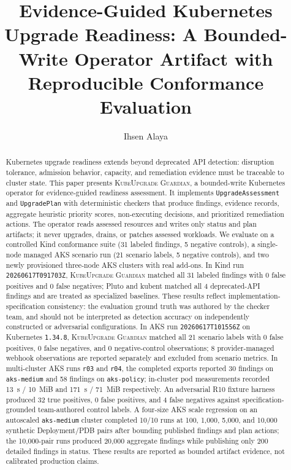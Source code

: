 \documentclass[10pt,journal]{IEEEtran}
\title{Evidence-Guided Kubernetes Upgrade Readiness: A Bounded-Write Operator Artifact with Reproducible Conformance Evaluation}
\author{Ihsen Alaya}
\newcommand{\tool}{\textsc{KubeUpgrade Guardian}}
\newcommand{\crd}[1]{\texttt{#1}}
\newcommand{\code}[1]{\texttt{#1}}
\begin{document}
\maketitle

\begin{abstract}
Kubernetes upgrade readiness extends beyond deprecated API detection: disruption tolerance, admission behavior, capacity, and remediation evidence must be traceable to cluster state. This paper presents \tool, a bounded-write Kubernetes operator for evidence-guided readiness assessment. It implements \crd{UpgradeAssessment} and \crd{UpgradePlan} with deterministic checkers that produce findings, evidence records, aggregate heuristic priority scores, non-executing decisions, and prioritized remediation actions. The operator reads assessed resources and writes only status and plan artifacts; it never upgrades, drains, or patches assessed workloads.
We evaluate on a controlled Kind conformance suite (31 labeled findings, 5 negative controls), a single-node managed AKS scenario run (21 scenario labels, 5 negative controls), and two newly provisioned three-node AKS clusters with real add-ons. In Kind run \code{20260617T091703Z}, \tool{} matched all 31 labeled findings with 0 false positives and 0 false negatives; Pluto and kubent matched all 4 deprecated-API findings and are treated as specialized baselines. These results reflect implementation-specification consistency: the evaluation ground truth was authored by the checker team, and should not be interpreted as detection accuracy on independently constructed or adversarial configurations. In AKS run \code{20260617T101556Z} on Kubernetes \code{1.34.8}, \tool{} matched all 21 scenario labels with 0 false positives, 0 false negatives, and 0 negative-control observations; 8 provider-managed webhook observations are reported separately and excluded from scenario metrics. In multi-cluster AKS runs \code{r03} and \code{r04}, the completed exports reported 30 findings on \code{aks-medium} and 58 findings on \code{aks-policy}; in-cluster pod measurements recorded 13~s / 10~MiB and 171~s / 71~MiB respectively. An adversarial R10 fixture harness produced 32 true positives, 0 false positives, and 4 false negatives against specification-grounded team-authored control labels. A four-size AKS scale regression on an autoscaled \code{aks-medium} cluster completed 10/10 runs at 100, 1,000, 5,000, and 10,000 synthetic Deployment/PDB pairs after bounding published findings and plan actions; the 10,000-pair runs produced 20,000 aggregate findings while publishing only 200 detailed findings in status. These results are reported as bounded artifact evidence, not calibrated production claims.
\end{abstract}
\end{document}
